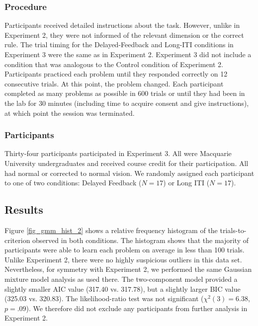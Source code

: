 \documentclass[doc, floatsintext]{apa7}
\begin{document}
\subsubsection{Procedure}
Participants received detailed instructions about the task.
However, unlike in Experiment 2, they were not informed of
the relevant dimension or the correct rule. The trial timing
for the Delayed-Feedback and Long-ITI conditions in
Experiment 3 were the same as in Experiment 2. Experiment 3
did not include a condition that was analogous to the
Control condition of Experiment 2. Participants practiced
each problem until they responded correctly on 12
consecutive trials. At this point, the problem changed. Each
participant completed as many problems as possible in 600
trials or until they had been in the lab for 30 minutes
(including time to acquire consent and give instructions),
at which point the session was terminated.

\subsubsection{Participants}
Thirty-four participants participated in Experiment 3. All
were Macquarie University undergraduates and received course
credit for their participation. All had normal or corrected
to normal vision. We randomly assigned each participant to
one of two conditions: Delayed Feedback ($N = 17$) or Long
ITI ($N = 17$).

\subsection{Results}
Figure \ref{fig_gmm_hist_2} shows a relative frequency
histogram of the trials-to-criterion observed in both
conditions. The histogram shows that the majority of
participants were able to learn each problem on average in
less than 100 trials.  Unlike Experiment 2, there were no
highly suspicious outliers in this data set. Nevertheless,
for symmetry with Experiment 2, we performed the same
Gaussian mixture model analysis as used there. The
two-component model provided a slightly smaller AIC value
(317.40 vs. 317.78), but a slightly larger BIC value (325.03
vs. 320.83). The likelihood-ratio test was not significant
($\chi^2(3) = 6.38$, $p = .09$). We therefore did not
exclude any participants from further analysis in Experiment
2.
\end{document}
